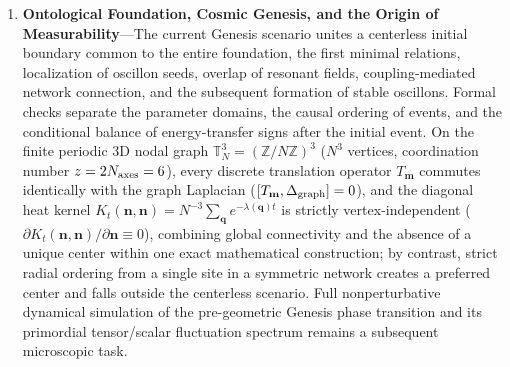 \documentclass[11pt,a4paper]{article}
\begin{document}
\begin{enumerate}[label=\arabic*.]
\item \textbf{Ontological Foundation, Cosmic Genesis, and the Origin of Measurability}---The current Genesis scenario unites a centerless initial boundary common to the entire foundation, the first minimal relations, localization of oscillon seeds, overlap of resonant fields, coupling-mediated network connection, and the subsequent formation of stable oscillons. Formal checks separate the parameter domains, the causal ordering of events, and the conditional balance of energy-transfer signs after the initial event. On the finite periodic 3D nodal graph $\mathbb{T}^3_N = (\mathbb{Z}/N\mathbb{Z})^3$ ($N^3$ vertices, coordination number $z = 2 N_{\rm axes} = 6$), every discrete translation operator $T_{\mathbf{m}}$ commutes identically with the graph Laplacian ($[T_{\mathbf{m}}, \Delta_{\rm graph}] = 0$), and the diagonal heat kernel $K_t(\mathbf{n}, \mathbf{n}) = N^{-3}\sum_{\mathbf{q}}e^{-\lambda(\mathbf{q})t}$ is strictly vertex-independent ($\partial K_t(\mathbf{n},\mathbf{n})/\partial\mathbf{n} \equiv 0$), combining global connectivity and the absence of a unique center within one exact mathematical construction; by contrast, strict radial ordering from a single site in a symmetric network creates a preferred center and falls outside the centerless scenario. Full nonperturbative dynamical simulation of the pre-geometric Genesis phase transition and its primordial tensor/scalar fluctuation spectrum remains a subsequent microscopic task.


\end{enumerate}
\end{document}
